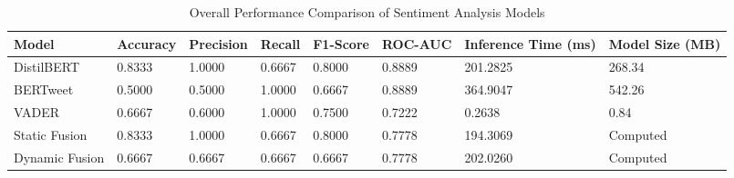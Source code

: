 \begin{table}[h!]
\centering
\caption{Overall Performance Comparison of Sentiment Analysis Models}
\label{tab:overall_performance}
\begin{tabular}{llllllll}
\toprule
Model & Accuracy & Precision & Recall & F1-Score & ROC-AUC & Inference Time (ms) & Model Size (MB) \\
\midrule
DistilBERT & 0.8333 & 1.0000 & 0.6667 & 0.8000 & 0.8889 & 201.2825 & 268.34 \\
BERTweet & 0.5000 & 0.5000 & 1.0000 & 0.6667 & 0.8889 & 364.9047 & 542.26 \\
VADER & 0.6667 & 0.6000 & 1.0000 & 0.7500 & 0.7222 & 0.2638 & 0.84 \\
Static Fusion & 0.8333 & 1.0000 & 0.6667 & 0.8000 & 0.7778 & 194.3069 & Computed \\
Dynamic Fusion & 0.6667 & 0.6667 & 0.6667 & 0.6667 & 0.7778 & 202.0260 & Computed \\
\bottomrule
\end{tabular}

\end{table}